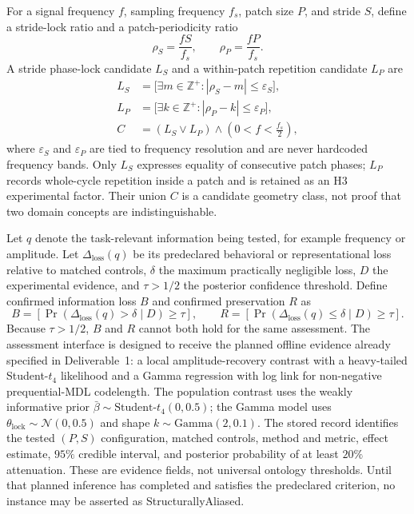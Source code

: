 \documentclass[
	letterpaper,
	10pt,
	unnumberedsections,
	twoside,
]{LTJournalArticle}
\newcommand{\valueof}[1]{\textsf{#1}}
\begin{document}
For a signal frequency $f$, sampling frequency $f_s$, patch size $P$, and stride $S$, define a stride-lock ratio and a patch-periodicity ratio
\begin{equation}
\rho_S=\frac{fS}{f_s},
\qquad
\rho_P=\frac{fP}{f_s}.
\label{eq:locking-ratio}
\end{equation}
A stride phase-lock candidate $L_S$ and a within-patch repetition candidate $L_P$ are
\begin{equation}
\begin{aligned}
L_S&=\big[\exists m\in\mathbb{Z}^{+}:|\rho_S-m|\leq\varepsilon_S\big],\\
L_P&=\big[\exists k\in\mathbb{Z}^{+}:|\rho_P-k|\leq\varepsilon_P\big],\\
C&=(L_S\vee L_P)\wedge\left(0<f<\frac{f_s}{2}\right),
\end{aligned}
\label{eq:locking-candidate}
\end{equation}
where $\varepsilon_S$ and $\varepsilon_P$ are tied to frequency resolution and are never hardcoded frequency bands. Only $L_S$ expresses equality of consecutive patch phases; $L_P$ records whole-cycle repetition inside a patch and is retained as an H3 experimental factor. Their union $C$ is a candidate geometry class, not proof that two domain concepts are indistinguishable.

Let $q$ denote the task-relevant information being tested, for example frequency or amplitude. Let $\Delta_{\mathrm{loss}}(q)$ be its predeclared behavioral or representational loss relative to matched controls, $\delta$ the maximum practically negligible loss, $D$ the experimental evidence, and $\tau>1/2$ the posterior confidence threshold. Define confirmed information loss $B$ and confirmed preservation $R$ as
\begin{equation}
B=\left[\Pr\!\left(\Delta_{\mathrm{loss}}(q)>\delta\mid D\right)\geq\tau\right],
\qquad
R=\left[\Pr\!\left(\Delta_{\mathrm{loss}}(q)\leq\delta\mid D\right)\geq\tau\right].
\label{eq:bayesian-evidence}
\end{equation}
Because $\tau>1/2$, $B$ and $R$ cannot both hold for the same assessment. The assessment interface is designed to receive the planned offline evidence already specified in Deliverable~1: a local amplitude-recovery contrast with a heavy-tailed Student-$t_4$ likelihood and a Gamma regression with log link for non-negative prequential-MDL codelength. The population contrast uses the weakly informative prior $\bar\beta\sim\text{Student-}t_4(0,0.5)$; the Gamma model uses $\theta_{\mathrm{lock}}\sim\mathcal N(0,0.5)$ and shape $k\sim\mathrm{Gamma}(2,0.1)$. The stored record identifies the tested $(P,S)$ configuration, matched controls, method and metric, effect estimate, $95\%$ credible interval, and posterior probability of at least $20\%$ attenuation. These are evidence fields, not universal ontology thresholds. Until that planned inference has completed and satisfies the predeclared criterion, no instance may be asserted as \valueof{StructurallyAliased}.
\end{document}
